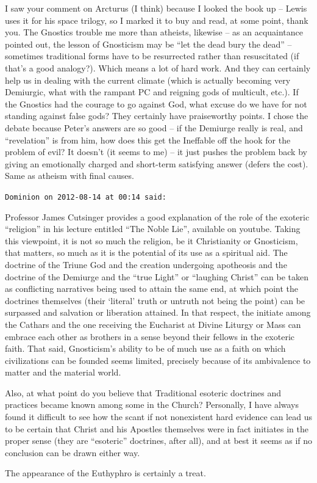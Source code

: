 \begin{footnotesize}
\begin{sffamily}
I saw your comment on Arcturus (I think) because I looked the book up -- Lewis uses it for his space trilogy, so I marked it to buy and read, at some point, thank you. The Gnostics trouble me more than atheists, likewise -- as an acquaintance pointed out, the lesson of Gnosticism may be ``let the dead bury the dead'' -- sometimes traditional forms have to be resurrected rather than resuscitated (if that's a good analogy?). Which means a lot of hard work. And they can certainly help us in dealing with the current climate (which is actually becoming very Demiurgic, what with the rampant PC and reigning gods of multicult, etc.). If the Gnostics had the courage to go against God, what excuse do we have for not standing against false gods? They certainly have praiseworthy points. I chose the debate because Peter's answers are so good -- if the Demiurge really is real, and ``revelation'' is from him, how does this get the Ineffable off the hook for the problem of evil? It doesn't (it seems to me) -- it just pushes the problem back by giving an emotionally charged and short-term satisfying answer (defers the cost). Same as atheism with final causes.

\hfill

\texttt{Dominion on 2012-08-14 at 00:14 said:}

Professor James Cutsinger provides a good explanation of the role of the exoteric ``religion'' in his lecture entitled ``The Noble Lie'', available on youtube. Taking this viewpoint, it is not so much the religion, be it Christianity or Gnosticism, that matters, so much as it is the potential of its use as a spiritual aid. The doctrine of the Triune God and the creation undergoing apotheosis and the doctrine of the Demiurge and the ``true Light'' or ``laughing Christ'' can be taken as conflicting narratives being used to attain the same end, at which point the doctrines themselves (their `literal' truth or untruth not being the point) can be surpassed and salvation or liberation attained. In that respect, the initiate among the Cathars and the one receiving the Eucharist at Divine Liturgy or Mass can embrace each other as brothers in a sense beyond their fellows in the exoteric faith. That said, Gnosticism's ability to be of much use as a faith on which civilizations can be founded seems limited, precisely because of its ambivalence to matter and the material world.

Also, at what point do you believe that Traditional esoteric doctrines and practices became known among some in the Church? Personally, I have always found it difficult to see how the scant if not nonexistent hard evidence can lead us to be certain that Christ and his Apostles themselves were in fact initiates in the proper sense (they are ``esoteric'' doctrines, after all), and at best it seems as if no conclusion can be drawn either way.

The appearance of the Euthyphro is certainly a treat.

\hfill

\end{sffamily}
\end{footnotesize}

